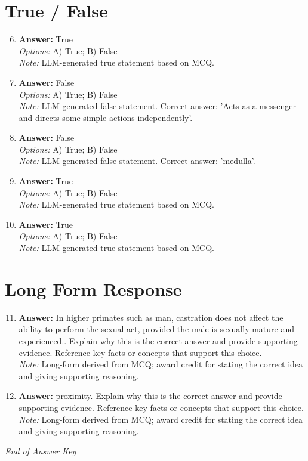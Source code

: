 \documentclass[12pt]{article}
\begin{document}
\section*{True / False}
\begin{enumerate}[label=\arabic*.]
\setcounter{enumi}{5}
\item \textbf{Answer:} True
\\ \textit{Options:} A) True; B) False
\\ \textit{Note:} LLM-generated true statement based on MCQ.
\item \textbf{Answer:} False
\\ \textit{Options:} A) True; B) False
\\ \textit{Note:} LLM-generated false statement. Correct answer: 'Acts as a messenger and directs some simple actions independently'.
\item \textbf{Answer:} False
\\ \textit{Options:} A) True; B) False
\\ \textit{Note:} LLM-generated false statement. Correct answer: 'medulla'.
\item \textbf{Answer:} True
\\ \textit{Options:} A) True; B) False
\\ \textit{Note:} LLM-generated true statement based on MCQ.
\item \textbf{Answer:} True
\\ \textit{Options:} A) True; B) False
\\ \textit{Note:} LLM-generated true statement based on MCQ.
\end{enumerate}

\section*{Long Form Response}
\begin{enumerate}[label=\arabic*.]
\setcounter{enumi}{10}
\item \textbf{Answer:} In higher primates such as man, castration does not affect the ability to perform the sexual act, provided the male is sexually mature and experienced.. Explain why this is the correct answer and provide supporting evidence. Reference key facts or concepts that support this choice.
\\ \textit{Note:} Long-form derived from MCQ; award credit for stating the correct idea and giving supporting reasoning.
\item \textbf{Answer:} proximity. Explain why this is the correct answer and provide supporting evidence. Reference key facts or concepts that support this choice.
\\ \textit{Note:} Long-form derived from MCQ; award credit for stating the correct idea and giving supporting reasoning.
\end{enumerate}

\vfill
\noindent\textit{End of Answer Key}
\end{document}
